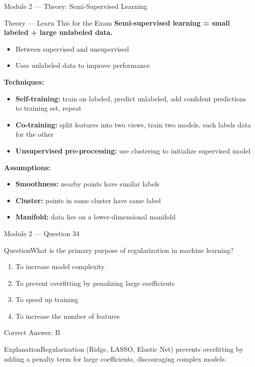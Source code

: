 \documentclass[aspectratio=169,10pt]{beamer}
\newcommand{\question}[1]{\begin{block}{Question}#1\end{block}}
\newcommand{\options}[4]{%
	\begin{enumerate}[label=\Alph*.,leftmargin=*]
		\item #1
		\item #2
		\item #3
		\item #4
	\end{enumerate}
}
\newcommand{\answerbox}[1]{\begin{exampleblock}{Correct Answer: #1}\end{exampleblock}}
\newcommand{\explain}[1]{\begin{block}{Explanation}#1\end{block}}
\newcommand{\theory}[1]{%
	\begin{block}{Theory --- Learn This for the Exam}
		\small #1
	\end{block}
}
\begin{document}
	\begin{frame}{Module 2 --- Theory: Semi-Supervised Learning}
		\theory{
			\textbf{Semi-supervised learning = small labeled + large unlabeled data.}
			\begin{itemize}
				\item Between supervised and unsupervised
				\item Uses unlabeled data to improve performance
			\end{itemize}
			\textbf{Techniques:}
			\begin{itemize}
				\item \textbf{Self-training:} train on labeled, predict unlabeled, add confident predictions to training set, repeat
				\item \textbf{Co-training:} split features into two views, train two models, each labels data for the other
				\item \textbf{Unsupervised pre-processing:} use clustering to initialize supervised model
			\end{itemize}
			\textbf{Assumptions:}
			\begin{itemize}
				\item \textbf{Smoothness:} nearby points have similar labels
				\item \textbf{Cluster:} points in same cluster have same label
				\item \textbf{Manifold:} data lies on a lower-dimensional manifold
			\end{itemize}
		}
	\end{frame}
	
	\begin{frame}{Module 2 --- Question 34}
		\question{What is the primary purpose of regularization in machine learning?}
		\options{To increase model complexity}{To prevent overfitting by penalizing large coefficients}{To speed up training}{To increase the number of features}
		\answerbox{B}
		\explain{Regularization (Ridge, LASSO, Elastic Net) prevents overfitting by adding a penalty term for large coefficients, discouraging complex models.}
	\end{frame}
	
\end{document}

